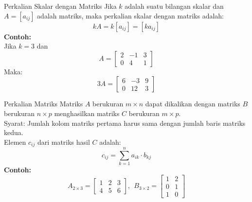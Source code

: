 \documentclass{beamer}
\begin{document}
\begin{frame}[t,fragile]{Perkalian Skalar dengan Matriks}
Jika $k$ adalah suatu bilangan skalar dan $A = [a_{ij}]$ adalah matriks, maka perkalian skalar dengan matriks adalah:
$$ kA = k[a_{ij}] = [ka_{ij}] $$
\vspace{0.3cm}
\textbf{Contoh:}\\
Jika $k = 3$ dan 
$$ A = \begin{bmatrix}
       	2 & -1 & 3 \\
	    0 & 4 & 1
        \end{bmatrix} $$
Maka:
$$ 3A = \begin{bmatrix}
       	6 & -3 & 9 \\
	    0 & 12 & 3
        \end{bmatrix} $$
\end{frame}

\begin{frame}[t,fragile]{Perkalian Matriks}
Matriks $A$ berukuran $m \times n$ dapat dikalikan dengan matriks $B$ berukuran $n \times p$ menghasilkan matriks $C$ berukuran $m \times p$.\\
\vspace{0.2cm}
Syarat: Jumlah kolom matriks pertama harus sama dengan jumlah baris matriks kedua.\\
\vspace{0.2cm}
Elemen $c_{ij}$ dari matriks hasil $C$ adalah:
$$ c_{ij} = \sum_{k=1}^{n} a_{ik} \cdot b_{kj} $$
\vspace{0.2cm}
\textbf{Contoh:}\\
$$ A_{2 \times 3} = \begin{bmatrix}
       	1 & 2 & 3 \\
	    4 & 5 & 6
        \end{bmatrix}, ~~ B_{3 \times 2} = \begin{bmatrix}
       	1 & 2 \\
	    0 & 1 \\
        1 & 0
        \end{bmatrix} $$
\end{frame}
\end{document}

